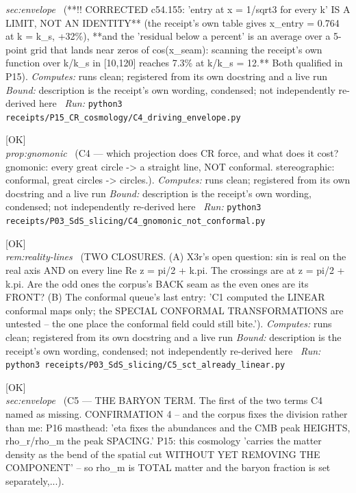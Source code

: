 \begin{description}
\textit{sec:envelope} \ (**!! CORRECTED c54.155: 'entry at x = 1/sqrt3 for every k' IS A LIMIT, NOT AN IDENTITY** (the receipt's own table gives x\_entry = 0.764 at k = k\_s, +32\%), **and the 'residual below a percent' is an average over a 5-point grid that lands near zeros of cos(x\_seam): scanning the receipt's own function over k/k\_s in [10,120] reaches 7.3\% at k/k\_s = 12.** Both qualified in P15). 
\emph{Computes:} runs clean; registered from its own docstring and a live run
 \emph{Bound:} description is the receipt's own wording, condensed; not independently re-derived here
\ \emph{Run:} \texttt{python3 receipts/P15\_CR\_cosmology/C4\_driving\_envelope.py}
\item[\label{rcpt:C4_gnomonic_not_conformal}\texttt{C4\_gnomonic\_not\_conformal}]\hfill\textsf{[OK]}\\
\textit{prop:gnomonic} \ (C4 --- which projection does CR force, and what does it cost? gnomonic: every great circle -> a straight line, NOT conformal. stereographic: conformal, great circles -> circles.). 
\emph{Computes:} runs clean; registered from its own docstring and a live run
 \emph{Bound:} description is the receipt's own wording, condensed; not independently re-derived here
\ \emph{Run:} \texttt{python3 receipts/P03\_SdS\_slicing/C4\_gnomonic\_not\_conformal.py}
\item[\label{rcpt:C5_sct_already_linear}\texttt{C5\_sct\_already\_linear}]\hfill\textsf{[OK]}\\
\textit{rem:reality-lines} \ (TWO CLOSURES. (A) X3r's open question: sin is real on the real axis AND on every line Re z = pi/2 + k.pi. The crossings are at z = pi/2 + k.pi. Are the odd ones the corpus's BACK seam as the even ones are its FRONT? (B) The conformal queue's last entry: 'C1 computed the LINEAR conformal maps only; the SPECIAL CONFORMAL TRANSFORMATIONS are untested -- the one place the conformal field could still bite.'). 
\emph{Computes:} runs clean; registered from its own docstring and a live run
 \emph{Bound:} description is the receipt's own wording, condensed; not independently re-derived here
\ \emph{Run:} \texttt{python3 receipts/P03\_SdS\_slicing/C5\_sct\_already\_linear.py}
\item[\label{rcpt:C5b_baryon_term}\texttt{C5b\_baryon\_term}]\hfill\textsf{[OK]}\\
\textit{sec:envelope} \ (C5 --- THE BARYON TERM. The first of the two terms C4 named as missing. CONFIRMATION 4 -- and the corpus fixes the division rather than me: P16 masthead: 'eta fixes the abundances and the CMB peak HEIGHTS, rho\_r/rho\_m the peak SPACING.' P15: this cosmology 'carries the matter density as the bend of the spatial cut WITHOUT YET REMOVING THE COMPONENT' -- so rho\_m is TOTAL matter and the baryon fraction is set separately,...). 

\end{description}
